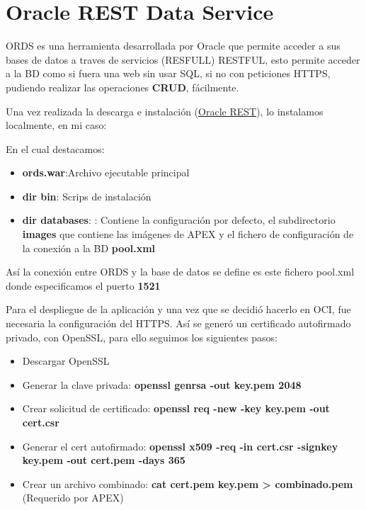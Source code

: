 \section{Oracle REST Data Service}
\acrfull{ORDS} es una herramienta desarrollada por Oracle que permite acceder a sus bases de datos a traves de servicios (RESFULL) \gls{RESTFUL}, esto permite acceder a la BD como si fuera una web sin usar \acrshort{SQL}, si no con peticiones \acrshort{HTTPS}, pudiendo realizar las operaciones \textbf{CRUD}, fácilmente.

Una vez realizada la descarga e instalación (\href{https://www.oracle.com/database/sqldeveloper/technologies/db-actions/download/}{Oracle REST}), lo instalamos localmente, en mi caso: 

En el cual destacamos:
\begin{itemize}
	\item \textbf{ords.war}:Archivo ejecutable principal
	\item \textbf{dir bin}: Scrips de instalación
	\item \textbf{dir databases}:
		: Contiene la configuración por defecto, el subdirectorio \textbf{images} que contiene las imágenes de \acrfull{APEX} y el fichero de configuración de la conexión a la BD \textbf{pool.xml}		
\end{itemize}
Así la conexión entre ORDS y la base de datos se define es este fichero pool.xml donde especificamos el puerto \textbf{1521}

Para el despliegue de la aplicación y una vez que se decidió hacerlo en \acrfull{OCI}, fue necesaria la configuración del \acrshort{HTTPS}. Así se generó un certificado autofirmado privado, con OpenSSL, para ello seguimos los siguientes pasos:
\begin{itemize}
	\item Descargar OpenSSL
	\item Generar la clave privada: \textbf{openssl genrsa -out key.pem 2048}
	\item Crear solicitud de certificado: \textbf{openssl req -new -key key.pem -out cert.csr}
	\item Generar el cert autofirmado: \textbf{openssl x509 -req -in cert.csr -signkey key.pem -out cert.pem -days 365
	}
	\item Crear un archivo combinado: \textbf{\textbf{cat cert.pem key.pem > combinado.pem}} (Requerido por APEX)
\end{itemize}

